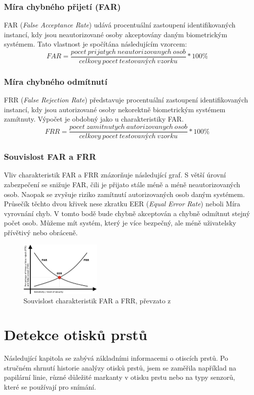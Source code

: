 \subsection{Míra chybného přijetí (FAR)}
FAR (\textit{False Acceptance Rate}) udává procentuální zastoupení identifikovaných instancí, kdy jsou neautorizované osoby akceptovány daným biometrickým systémem. Tato vlastnost je spočítána následujícím vzorcem:
$$FAR = \frac{pocet\:prijatych\:neautorizovanych\:osob}{celkovy\:pocet\:testovaných\:vzorku} * 100 \%$$

\subsection{Míra chybného odmítnutí}
FRR (\textit{False Rejection Rate}) představuje procentuální zastoupení identifikovaných instancí, kdy jsou autorizované osoby nekorektně biometrickým systémem zamítnuty. Výpočet je obdobný jako u charakteristiky FAR.
$$FRR = \frac{pocet\:zamitnutych\:autorizovanych\:osob}{celkovy\:pocet\:testovaných\:vzorku} * 100 \%$$

\subsection{Souvislost FAR a FRR}
Vliv charakteristik FAR a FRR znázorňuje následující graf. S větší úrovní zabezpečení se snižuje FAR, čili je přijato stále méně a méně neautorizovaných osob. Naopak se zvyšuje riziko zamítnutí autorizovaných osob daným systémem. Průsečík těchto dvou křivek nese zkratku EER (\textit{Equal Error Rate}) neboli Míra vyrovnání chyb. V tomto bodě bude chybně akceptován a chybně odmítnut stejný počet osob. Můžeme mít systém, který je více bezpečný, ale méně uživatelsky přívětivý nebo obráceně. \cite{FARFRR}

\begin{figure}[!htbp]
    \centering
    \includegraphics[width=150px]{obrazky-figures/frrfar.jpeg}
    \caption{Souvislost charakteristik FAR a FRR, převzato z \cite{FARFRR}}
\end{figure}

\chapter{Detekce otisků prstů}
Následující kapitola se zabývá základními informacemi o otiscích prstů. Po stručném shrnutí historie analýzy otisků prstů, jsem se zaměřila například na papilární linie, různé důležité markanty v otisku prstu nebo na typy senzorů, které se používají pro snímání.
